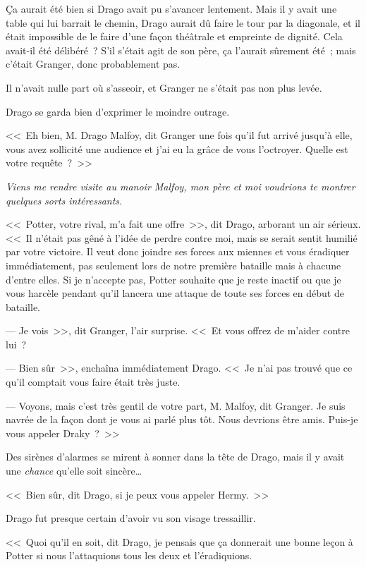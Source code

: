 Ça aurait été bien si Drago avait pu s'avancer lentement. Mais il y avait une table qui lui barrait le chemin, Drago aurait dû faire le tour par la diagonale, et il était impossible de le faire d'une façon théâtrale et empreinte de dignité. Cela avait-il été délibéré~? S'il s'était agit de son père, ça l'aurait sûrement été~; mais c'était Granger, donc probablement pas.

Il n'avait nulle part où s'asseoir, et Granger ne s'était pas non plus levée.

Drago se garda bien d'exprimer le moindre outrage.

<<~Eh bien, M. Drago Malfoy, dit Granger une fois qu'il fut arrivé jusqu'à elle, vous avez sollicité une audience et j'ai eu la grâce de vous l'octroyer. Quelle est votre requête~?~>>

\emph{Viens me rendre visite au manoir Malfoy, mon père et moi voudrions te montrer quelques sorts intéressants.}

<<~Potter, votre rival, m'a fait une offre~>>, dit Drago, arborant un air sérieux. <<~Il n'était pas gêné à l'idée de perdre contre moi, mais se serait sentit humilié par votre victoire. Il veut donc joindre ses forces aux miennes et vous éradiquer immédiatement, pas seulement lors de notre première bataille mais à chacune d'entre elles. Si je n'accepte pas, Potter souhaite que je reste inactif ou que je vous harcèle pendant qu'il lancera une attaque de toute ses forces en début de bataille.

--- Je vois~>>, dit Granger, l'air surprise. <<~Et vous offrez de m'aider contre lui~?

--- Bien sûr~>>, enchaîna immédiatement Drago. <<~Je n'ai pas trouvé que ce qu'il comptait vous faire était très juste.

--- Voyons, mais c'est très gentil de votre part, M. Malfoy, dit Granger. Je suis navrée de la façon dont je vous ai parlé plus tôt. Nous devrions être amis. Puis-je vous appeler Draky~?~>>

Des sirènes d'alarmes se mirent à sonner dans la tête de Drago, mais il y avait une \emph{chance} qu'elle soit sincère…

<<~Bien sûr, dit Drago, si je peux vous appeler Hermy.~>>

Drago fut presque certain d'avoir vu son visage tressaillir.

<<~Quoi qu'il en soit, dit Drago, je pensais que ça donnerait une bonne leçon à Potter si nous l'attaquions tous les deux et l'éradiquions.

